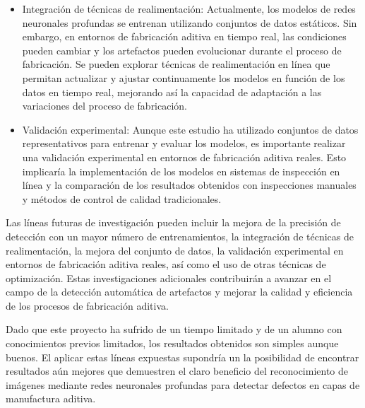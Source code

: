 \documentclass{report}
\begin{document}
\begin{itemize}
\item Integración de técnicas de realimentación: Actualmente, los modelos de redes neuronales profundas se entrenan utilizando conjuntos de datos estáticos. Sin embargo, en entornos de fabricación aditiva en tiempo real, las condiciones pueden cambiar y los artefactos pueden evolucionar durante el proceso de fabricación. Se pueden explorar técnicas de realimentación en línea que permitan actualizar y ajustar continuamente los modelos en función de los datos en tiempo real, mejorando así la capacidad de adaptación a las variaciones del proceso de fabricación.

\item Validación experimental: Aunque este estudio ha utilizado conjuntos de datos representativos para entrenar y evaluar los modelos, es importante realizar una validación experimental en entornos de fabricación aditiva reales. Esto implicaría la implementación de los modelos en sistemas de inspección en línea y la comparación de los resultados obtenidos con inspecciones manuales y métodos de control de calidad tradicionales.

\end{itemize}


Las líneas futuras de investigación pueden incluir la mejora de la precisión de detección con un mayor número de entrenamientos, la integración de técnicas de realimentación, la mejora del conjunto de datos, la validación experimental en entornos de fabricación aditiva reales, así como el uso de otras técnicas de optimización. Estas investigaciones adicionales contribuirán a avanzar en el campo de la detección automática de artefactos y mejorar la calidad y eficiencia de los procesos de fabricación aditiva.

Dado que este proyecto ha sufrido de un tiempo limitado y de un alumno con conocimientos previos limitados, los resultados obtenidos son simples aunque buenos. El aplicar estas líneas expuestas supondría un la posibilidad de encontrar resultados aún mejores que demuestren el claro beneficio del reconocimiento de imágenes mediante redes neuronales profundas para detectar defectos en capas de manufactura aditiva.
\end{document}

